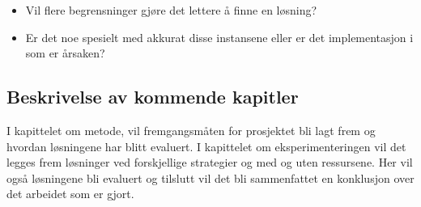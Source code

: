 \begin{itemize}
\item Vil flere begrensninger gjøre det lettere å finne en løsning?
\item Er det noe spesielt med akkurat disse instansene eller er det implementasjon i \ilog som er årsaken?
\end{itemize}

\subsection{Beskrivelse av kommende kapitler}
I kapittelet om metode, vil fremgangsmåten for prosjektet bli lagt frem og hvordan løsningene har blitt evaluert. I kapittelet om eksperimenteringen vil det legges frem løsninger ved forskjellige strategier og med og uten ressursene. Her vil også løsningene bli evaluert og tilslutt vil det bli sammenfattet en konklusjon over det arbeidet som er gjort.
